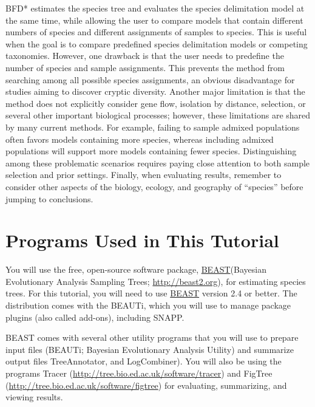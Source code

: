 \documentclass{article}
\newcommand{\program}[1]{#1\xspace}
\newcommand{\beast}{\href{http://beast2.org}{\program{BEAST}}\xspace}
\begin{document}
BFD* estimates the species tree and evaluates the species delimitation model at the same time, while allowing the user to compare models that contain different numbers of species and different assignments of samples to species. This is useful when the goal is to compare predefined species delimitation models or competing taxonomies. However, one drawback is that the user needs to predefine the number of species and sample assignments. This prevents the method from searching among all possible species assignments, an obvious disadvantage for studies aiming to discover cryptic diversity. Another major limitation is that the method does not explicitly consider gene flow, isolation by distance, selection, or several other important biological processes; however, these limitations are shared by many current methods. For example, failing to sample admixed populations often favors models containing more species, whereas including admixed populations will support more models containing fewer species. Distinguishing among these problematic scenarios requires paying close attention to both sample selection and prior settings. Finally, when evaluating results, remember to consider other aspects of the biology, ecology, and geography of ``species'' before jumping to conclusions.

\section{Programs Used in This Tutorial}
You will use the free, open-source software package, \beast (Bayesian
Evolutionary Analysis Sampling Trees;
\href{http://beast2.org}{\url{http://beast2.org}}), for
estimating species trees.
For this tutorial, you will need to use \beast version 2.4 or better. 
The distribution comes with the \program{BEAUTi}, which you will use to manage package plugins (also called add-ons), including \program{SNAPP}.

\program{BEAST} comes with several other utility programs that you will use to prepare 
input files (\program{BEAUTi}; Bayesian Evolutionary Analysis
Utility) and summarize output files \program{TreeAnnotator}, and \program{LogCombiner}).
You will also be using the programs \program{Tracer}
(\href{http://tree.bio.ed.ac.uk/software/tracer}{\url{http://tree.bio.ed.ac.uk/software/tracer}})
and \program{FigTree}
(\href{http://tree.bio.ed.ac.uk/software/figtree}{\url{http://tree.bio.ed.ac.uk/software/figtree}})
for evaluating, summarizing, and viewing results.
\end{document}
